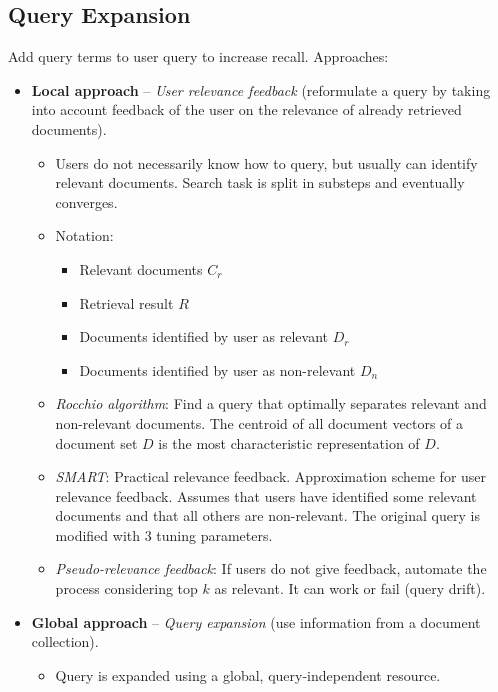   \subsection{Query Expansion} %
  \label{sub:query_expansion}
    Add query terms to user query to increase recall. Approaches:
    \begin{itemize}
      \item \textbf{Local approach} -- \emph{User relevance feedback} (reformulate a query by taking into account feedback of the user on the relevance of already retrieved documents).
      \begin{itemize}
        \item Users do not necessarily know how to query, but usually can identify relevant documents. Search task is split in substeps and eventually converges.
        \item Notation:
        \begin{itemize}
          \item Relevant documents $C_r$
          \item Retrieval result $R$
          \item Documents identified by user as relevant $D_r$
          \item Documents identified by user as non-relevant $D_n$
        \end{itemize}
        \item \emph{Rocchio algorithm}: Find a query that optimally separates relevant and non-relevant documents. The centroid of all document vectors of a document set $D$ is the most characteristic representation of $D$.
        \item \emph{SMART}: Practical relevance feedback. Approximation scheme for user relevance feedback. Assumes that users have identified some relevant documents and that all others are non-relevant. The original query is modified with 3 tuning parameters.
        \item \emph{Pseudo-relevance feedback}: If users do not give feedback, automate the process considering top $k$ as relevant. It can work or fail (query drift).
      \end{itemize}
      \item \textbf{Global approach} -- \emph{Query expansion} (use information from a document collection).
      \begin{itemize}
        \item Query is expanded using a global, query-independent resource.
        \begin{itemize}

\end{itemize}
\end{itemize}
\end{itemize}
